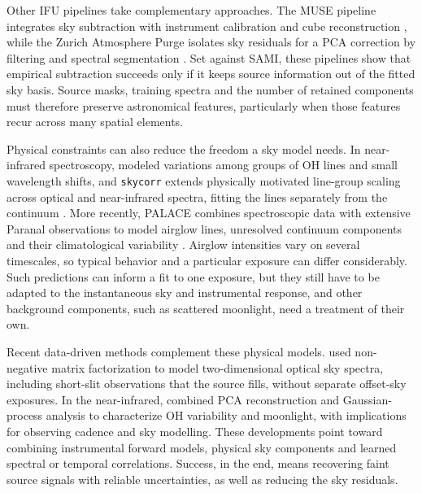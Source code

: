 Other IFU pipelines take complementary approaches. The MUSE pipeline
integrates sky subtraction with instrument calibration and cube
reconstruction \citep{Weilbacher2020}, while the Zurich Atmosphere Purge
isolates sky residuals for a PCA correction by filtering and spectral
segmentation \citep{Soto2016}. Set against SAMI, these pipelines show that
empirical subtraction succeeds only if it keeps source information out of the
fitted sky basis. Source masks, training spectra and the number of retained
components must therefore preserve astronomical features, particularly when
those features recur across many spatial elements.

Physical constraints can also reduce the freedom a sky model needs. In
near-infrared spectroscopy, \citet{Davies2007} modeled variations among
groups of OH lines and small wavelength shifts, and \texttt{skycorr} extends
physically motivated line-group scaling across optical and near-infrared
spectra, fitting the lines separately from the continuum \citep{Noll2014}.
More recently, PALACE combines spectroscopic data with extensive Paranal
observations to model airglow lines, unresolved continuum components and
their climatological variability \citep{Noll2025}. Airglow intensities vary
on several timescales, so typical behavior and a particular exposure can
differ considerably. Such predictions can inform a fit to one exposure, but
they still have to be adapted to the instantaneous sky and instrumental
response, and other background components, such as scattered moonlight, need
a treatment of their own.

Recent data-driven methods complement these physical models.
\citet{Kolganov2025} used non-negative matrix factorization to model
two-dimensional optical sky spectra, including short-slit observations that
the source fills, without separate offset-sky exposures. In the
near-infrared, \citet{Dauphin2024} combined PCA reconstruction and
Gaussian-process analysis to characterize OH variability and moonlight, with
implications for observing cadence and sky modelling. These developments
point toward combining instrumental forward models, physical sky components
and learned spectral or temporal correlations. Success, in the end, means
recovering faint source signals with reliable uncertainties, as well as
reducing the sky residuals.
